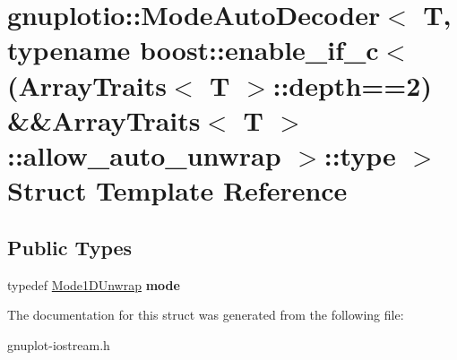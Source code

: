 \hypertarget{structgnuplotio_1_1ModeAutoDecoder_3_01T_00_01typename_01boost_1_1enable__if__c_3_07ArrayTraits_c59d48135a150cfba8b2cca37ce62323}{}\section{gnuplotio\+:\+:Mode\+Auto\+Decoder$<$ T, typename boost\+:\+:enable\+\_\+if\+\_\+c$<$(Array\+Traits$<$ T $>$\+:\+:depth==2) \&\&Array\+Traits$<$ T $>$\+:\+:allow\+\_\+auto\+\_\+unwrap $>$\+:\+:type $>$ Struct Template Reference}
\label{structgnuplotio_1_1ModeAutoDecoder_3_01T_00_01typename_01boost_1_1enable__if__c_3_07ArrayTraits_c59d48135a150cfba8b2cca37ce62323}
\subsection*{Public Types}
\begin{DoxyCompactItemize}
\item 
\mbox{\label{structgnuplotio_1_1ModeAutoDecoder_3_01T_00_01typename_01boost_1_1enable__if__c_3_07ArrayTraits_c59d48135a150cfba8b2cca37ce62323_a9e0be01a3f2d3ea2184dab631c3bb950}} 
typedef \hyperlink{structgnuplotio_1_1Mode1DUnwrap}{Mode1\+D\+Unwrap} {\bfseries mode}
\end{DoxyCompactItemize}


The documentation for this struct was generated from the following file\+:\begin{DoxyCompactItemize}
\item 
gnuplot-\/iostream.\+h\end{DoxyCompactItemize}
